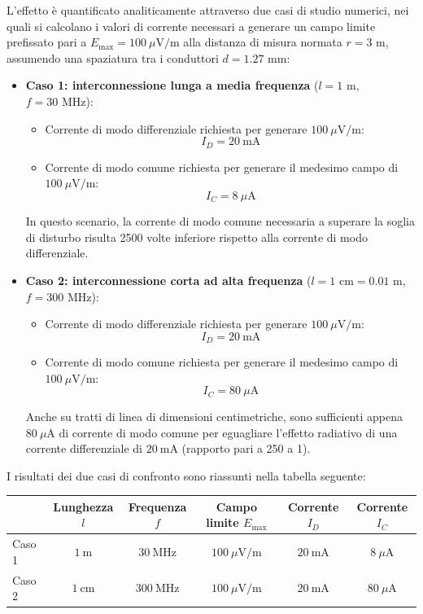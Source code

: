 L'effetto è quantificato analiticamente attraverso due casi di studio numerici, nei quali si calcolano i valori di corrente necessari a generare un campo limite prefissato pari a $E_{\text{max}} = 100\ \mu\text{V/m}$ alla distanza di misura normata $r = 3\text{ m}$, assumendo una spaziatura tra i conduttori $d = 1.27\text{ mm}$:
\begin{itemize}
    \item \textbf{Caso 1: interconnessione lunga a media frequenza} ($l = 1\text{ m}$, $f = 30\text{ MHz}$):
    \begin{itemize}
        \item Corrente di modo differenziale richiesta per generare $100\ \mu\text{V/m}$:
        \[
        I_D = 20\ \text{mA}
        \]
        \item Corrente di modo comune richiesta per generare il medesimo campo di $100\ \mu\text{V/m}$:
        \[
        I_C = 8\ \mu\text{A}
        \]
    \end{itemize}
    In questo scenario, la corrente di modo comune necessaria a superare la soglia di disturbo risulta 2500 volte inferiore rispetto alla corrente di modo differenziale.
    \item \textbf{Caso 2: interconnessione corta ad alta frequenza} ($l = 1\text{ cm} = 0.01\text{ m}$, $f = 300\text{ MHz}$):
    \begin{itemize}
        \item Corrente di modo differenziale richiesta per generare $100\ \mu\text{V/m}$:
        \[
        I_D = 20\ \text{mA}
        \]
        \item Corrente di modo comune richiesta per generare il medesimo campo di $100\ \mu\text{V/m}$:
        \[
        I_C = 80\ \mu\text{A}
        \]
    \end{itemize}
    Anche su tratti di linea di dimensioni centimetriche, sono sufficienti appena $80\ \mu\text{A}$ di corrente di modo comune per eguagliare l'effetto radiativo di una corrente differenziale di $20\ \text{mA}$ (rapporto pari a 250 a 1).
\end{itemize}

I risultati dei due casi di confronto sono riassunti nella tabella seguente:
\begin{center}
\begin{tabular}{|l|c|c|c|c|c|}
\hline
\textbf{} & \textbf{Lunghezza $l$} & \textbf{Frequenza $f$} & \textbf{Campo limite $E_{\text{max}}$} & \textbf{Corrente $I_D$} & \textbf{Corrente $I_C$} \\
\hline
Caso 1 & $1\ \text{m}$ & $30\ \text{MHz}$ & $100\ \mu\text{V/m}$ & $20\ \text{mA}$ & $8\ \mu\text{A}$ \\
\hline
Caso 2 & $1\ \text{cm}$ & $300\ \text{MHz}$ & $100\ \mu\text{V/m}$ & $20\ \text{mA}$ & $80\ \mu\text{A}$ \\
\hline
\end{tabular}
\end{center}

